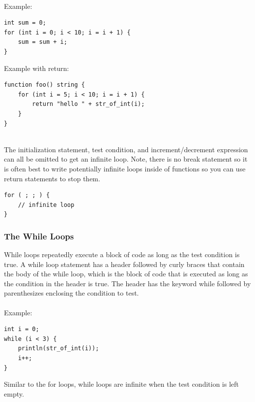 \documentclass[12pt]{article}
\begin{document}
\\
Example:\\
\begin{lstlisting}
int sum = 0;
for (int i = 0; i < 10; i = i + 1) {
	sum = sum + i;
}
\end{lstlisting}
Example with return:\\
\begin{lstlisting}
function foo() string {
    for (int i = 5; i < 10; i = i + 1) {
        return "hello " + str_of_int(i);
    }
}
\end{lstlisting}
\\
The initialization statement, test condition, and increment/decrement expression can all be omitted to get an infinite loop. Note, there is no break statement so it is often best to write potentially infinite loops inside of functions so you can use return statements to stop them.
\\
\begin{lstlisting}
for ( ; ; ) {
	// infinite loop
}
\end{lstlisting}

\subsubsection{The While Loops}
While loops repeatedly execute a block of code as long as the test condition is true.
A while loop statement has a header followed by curly braces that contain the body of the while loop, which is the block of code that is executed as long as the condition in the header is true. The header has the keyword while followed by parenthesizes enclosing the condition to test.\\
\\
Example: \\
\begin{lstlisting}
int i = 0;
while (i < 3) {
    println(str_of_int(i));
    i++;
}
\end{lstlisting}

Similar to the for loops, while loops are infinite when the test condition is left empty.
\end{document}
